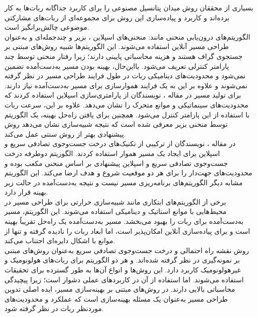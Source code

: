 بسیاری از محققان روش میدان پتانسیل مصنوعی را برای کاربرد جداگانه ربات‌ها به کار برده‌اند و کاربرد و پیاده‌سازی این روش برای مجموعه‌ای از ربات‌های مشارکتی موضوعی چالش‌برانگیز است.
\\
الگوریتم‌های درون‌یابی منحنی مانند: منحنی‌های اسپلاین
\noindent\unskip{}،
بزیر
\noindent\unskip{}و
چندجمله‌ای
\noindent\unskip{}و
به‌عنوان طراحی مسیر آنلاین استفاده می‌شوند.
این الگوریتم‌ها شبیه روش‌های مبتنی بر جستجوی گراف هستند و هزینه محاسباتی پایینی دارند؛ زیرا رفتار منحنی توسط چند پارامتر کنترلی تعریف می‌شود.
بااین‌حال، بهینه بودن مسیر به‌دست‌آمده تضمین نمی‌شود و محدودیت‌های دینامیکی ربات در طول فرایند طراحی مسیر در نظر گرفته نمی‌شوند و علاوه بر این به یک فرایند هموارسازی 
\noindent\unskip{}
برای مسیر به‌دست‌آمده نیاز دارند.
برای تولید مسیر در مقاله 
\cite{yang2017kinematic}
، نویسندگان از پارامتری‌سازی اسپلاین استفاده کردند که محدودیت‌های سینماتیکی و موانع متحرک را نشان می‌دهد.
علاوه بر این، سرعت ربات با استفاده از این پارامتر کنترل می‌شود.
همچنین برای یافتن راه‌حل بهینه، یک الگوریتم توسط منحنی بزیر معرفی شده است که نتیجه شبیه‌سازی نشان می‌دهد روش پیشنهادی بهتر از روش سنتی عمل می‌کند.
\\
در مقاله 
\cite{sudhakara2017optimal}
، نویسندگان از ترکیبی از تکنیک‌های درخت جست‌وجوی تصادفی سریع
\noindent\unskip{}
و اسپلاین برای ایجاد یک مسیر هموار استفاده کردند.
الگوریتم دوطرفه درخت جست‌وجوی تصادفی سریع و اسپلاین پیشنهادی بر اساس منحنی مکعب بوده و محدودیت‌های جهت‌دار را برای هر دو موقعیت شروع و هدف ارضا می‌کند.
این الگوریتم مشابه دیگر الگوریتم‌های برنامه‌ریزی مسیر نیست و نتیجه به‌دست‌آمده در حالت زیر بهینه قرار دارد.
\\
برخی از الگوریتم‌های ابتکاری مانند شبیه‌سازی حرارتی
\noindent\unskip{}
\cite{miao2013dynamic}
برای طراحی مسیر در محیط‌هایی با موانع استاتیک و دینامیکی استفاده می‌شوند.
این الگوریتم، مسیر به‌دست‌آمده برای ربات را بهبود می‌بخشد. مسیر به‌دست‌آمده یک راه‌حل تقریباً بهینه است و برای پیاده‌سازی آنلاین امکان‌پذیر است، اما ابعاد ربات را نادیده گرفته و تنها از موانع با اشکال دایره‌ای اجتناب می‌کند.
\\
روش نقشه‌ راه احتمالی و درخت جست‌وجوی تصادفی سریع به‌عنوان روش‌های مبتنی بر نمونه‌گیری در نظر گرفته شده‌اند.
و هر دو الگوریتم‌ برای ربات‌های هولونومیک و غیرهولونومیک کاربرد دارد.
این روش‌ها و انواع آن‌ها به طور گسترده برای تحقیقات استفاده می‌شوند. اما استفاده از آن در کاربردهای عملی دشوار است؛ زیرا پیچیدگی محاسباتی بالایی دارند.
در روش‌های مبتنی بر بهینه‌سازی مسیر، ایده اصلی تدوین طراحی مسیر به‌عنوان یک مسئله بهینه‌سازی است که عملکرد و محدودیت‌های موردنظر ربات در نظر گرفته شود.
